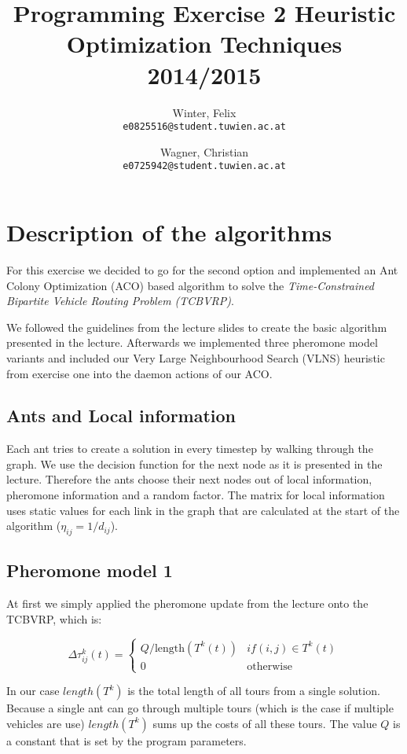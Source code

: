 \documentclass[a4paper]{scrartcl}
\author{
  Winter, Felix\\
  \texttt{e0825516@student.tuwien.ac.at}
  \and
  Wagner, Christian\\
  \texttt{e0725942@student.tuwien.ac.at}
}
\title{Programming Exercise 2 Heuristic Optimization Techniques 2014/2015}
\begin{document}
\setlength{\abovedisplayskip}{0pt}
\setlength{\belowdisplayskip}{0pt}

\begingroup
 \makeatletter
 \maketitle
\endgroup

\section{Description of the algorithms}

For this exercise we decided to go for the second option and implemented an Ant Colony Optimization (ACO) based algorithm to solve the \emph{Time-Constrained Bipartite Vehicle Routing Problem (TCBVRP)}.

We followed the guidelines from the lecture slides to create the basic algorithm presented in the lecture. Afterwards we implemented three pheromone model variants and included our Very Large Neighbourhood Search (VLNS) heuristic from exercise one into the daemon actions of our ACO.


\subsection{Ants and Local information}
Each ant tries to create a solution in every timestep by walking through the graph.
We use the decision function for the next node as it is presented in the lecture. Therefore the ants choose their next nodes out of local information, pheromone information and a random factor. The matrix for local information uses static values for each link in the graph that are calculated at the start of the algorithm ($\eta_{ij} = 1 / d_{ij}$). 


\subsection{Pheromone model 1}
At first we simply applied the pheromone update from the lecture onto the TCBVRP, which is:

\begin{equation}
  \Delta \tau_{ij}^k(t) = \begin{cases}
    Q / \text{length}(T^k(t)) & if(i,j) \in T^k(t) \\
    0 & \text{otherwise}
  \end{cases} 
\end{equation}

In our case $length(T^k)$ is the total length of all tours from a single solution. Because a single ant can go through multiple tours (which is the case if multiple vehicles are use) $length(T^k)$ sums up the costs of all these tours.
The value $Q$ is a constant that is set by the program parameters.
\end{document}
